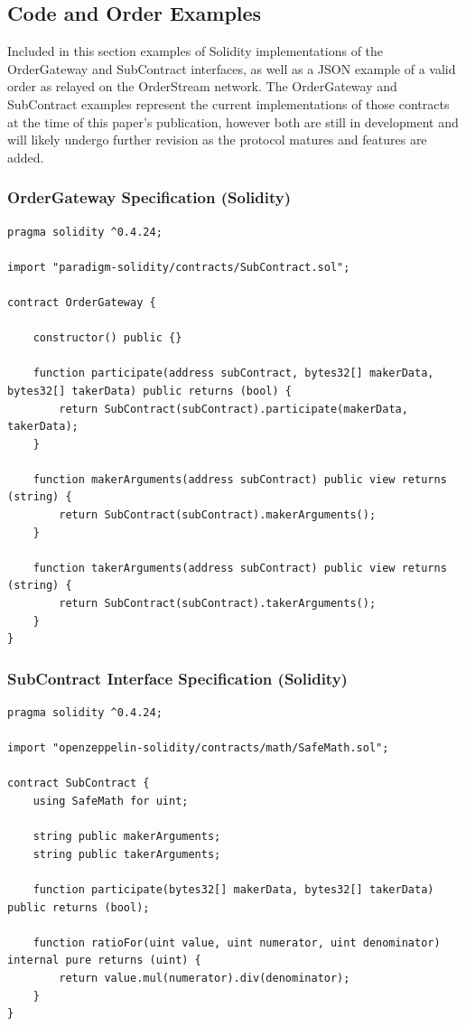 \documentclass[9pt]{article}
\begin{document}
\subsection{Code and Order Examples}
\noindent Included in this section examples of Solidity implementations of the OrderGateway and SubContract interfaces, as well as a JSON example of a valid order as relayed on the OrderStream network. The OrderGateway and SubContract examples represent the current implementations of those contracts at the time of this paper's publication, however both are still in development and will likely undergo further revision as the protocol matures and features are added.

\subsubsection{OrderGateway Specification (Solidity)}\label{ordergateway code}
\begin{lstlisting}[language=Solidity]
pragma solidity ^0.4.24;

import "paradigm-solidity/contracts/SubContract.sol";

contract OrderGateway {

    constructor() public {}

    function participate(address subContract, bytes32[] makerData, bytes32[] takerData) public returns (bool) {
        return SubContract(subContract).participate(makerData, takerData);
    }

    function makerArguments(address subContract) public view returns (string) {
        return SubContract(subContract).makerArguments();
    }

    function takerArguments(address subContract) public view returns (string) {
        return SubContract(subContract).takerArguments();
    }
}
\end{lstlisting}

\subsubsection{SubContract Interface Specification (Solidity)}\label{subcontract code}
\begin{lstlisting}[language=Solidity]
pragma solidity ^0.4.24;

import "openzeppelin-solidity/contracts/math/SafeMath.sol";

contract SubContract {
    using SafeMath for uint;

    string public makerArguments;
    string public takerArguments;

    function participate(bytes32[] makerData, bytes32[] takerData) public returns (bool);

    function ratioFor(uint value, uint numerator, uint denominator) internal pure returns (uint) {
        return value.mul(numerator).div(denominator);
    }
}
\end{lstlisting}
\end{document}
